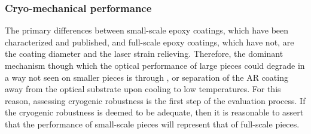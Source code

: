 
\subsubsection{Cryo-mechanical performance}
\label{sec:sapphire_ar_coating_epoxy_cryo_mechanical_performance}

The primary differences between small-scale epoxy coatings, which have been characterized and published, and full-scale epoxy coatings, which have not, are the coating diameter and the laser strain relieving. Therefore, the dominant mechanism though which the optical performance of large pieces could degrade in a way not seen on smaller pieces is through , or separation of the AR coating away from the optical substrate upon cooling to low temperatures. For this reason, assessing cryogenic robustness is the first step of the evaluation process. If the cryogenic robustness is deemed to be adequate, then it is reasonable to assert that the performance of small-scale pieces will represent that of full-scale pieces.

